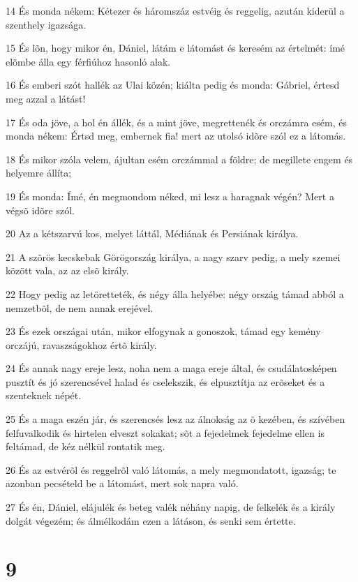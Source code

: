 \par 14 És monda nékem: Kétezer és háromszáz estvéig és reggelig, azután kiderül a szenthely igazsága.
\par 15 És lõn, hogy mikor én, Dániel, látám e látomást és keresém az értelmét: ímé elõmbe álla egy férfiúhoz hasonló alak.
\par 16 És emberi szót hallék az Ulai közén; kiálta pedig és monda: Gábriel, értesd meg azzal a látást!
\par 17 És oda jöve, a hol én állék, és a mint jöve, megrettenék és orczámra esém, és monda nékem: Értsd meg, embernek fia! mert az utolsó idõre szól ez a látomás.
\par 18 És mikor szóla velem, ájultan esém orczámmal a földre; de megillete engem és helyemre állíta;
\par 19 És monda: Ímé, én megmondom néked, mi lesz a haragnak végén? Mert a végsõ idõre szól.
\par 20 Az a kétszarvú kos, melyet láttál, Médiának és Persiának királya.
\par 21 A szõrös kecskebak Görögország királya, a nagy szarv pedig, a mely szemei között vala,  az az elsõ király.
\par 22 Hogy pedig az letöretteték, és négy álla helyébe: négy ország támad abból a nemzetbõl, de nem annak erejével.
\par 23 És ezek országai után, mikor elfogynak a gonoszok, támad egy kemény orczájú, ravaszságokhoz értõ király.
\par 24 És annak nagy ereje lesz, noha nem a maga ereje által, és csudálatosképen pusztít és jó szerencsével halad és cselekszik, és elpusztítja az erõseket és a szenteknek népét.
\par 25 És a maga eszén jár, és szerencsés lesz az álnokság az õ kezében, és szívében felfuvalkodik és hirtelen elveszt sokakat; sõt a fejedelmek fejedelme ellen is feltámad, de kéz nélkül rontatik meg.
\par 26 És az estvérõl és reggelrõl való látomás, a mely megmondatott, igazság; te azonban pecsételd be a látomást, mert  sok napra való.
\par 27 És én, Dániel, elájulék és beteg valék néhány napig, de felkelék és a király dolgát végezém; és álmélkodám ezen a látáson, és senki sem értette.

\chapter{9}

